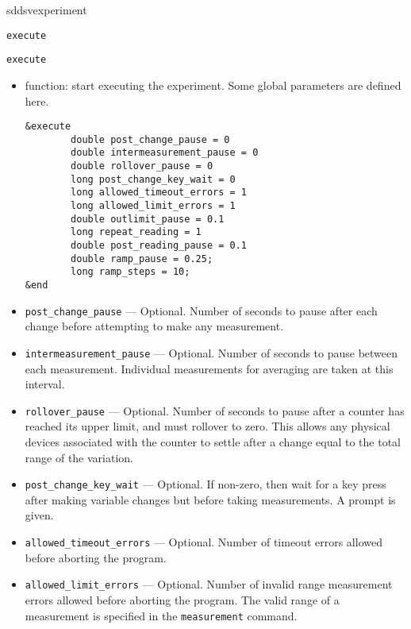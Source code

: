 \begin{sddsprog}{sddsvexperiment}
\begin{itemize}
\begin{latexonly}
\newpage\begin{center}{\Large \verb+execute+}\end{center}
\end{latexonly}
\begin{htmlonly}
  \item {\Large \verb+execute+}
\end{htmlonly}
  \begin{itemize}
    \item function: start executing the experiment. Some global parameters are defined here.
\begin{verbatim}
&execute
        double post_change_pause = 0
        double intermeasurement_pause = 0
        double rollover_pause = 0
        long post_change_key_wait = 0
        long allowed_timeout_errors = 1
        long allowed_limit_errors = 1
        double outlimit_pause = 0.1
        long repeat_reading = 1
        double post_reading_pause = 0.1
        double ramp_pause = 0.25;
        long ramp_steps = 10;
&end
\end{verbatim}
    \item {\verb+post_change_pause+} ---  Optional. Number of seconds to pause after each change before
      attempting to make any measurement.

    \item {\verb+intermeasurement_pause+} --- Optional. Number of
      seconds to pause between each measurement.  Individual
      measurements for averaging are taken at this interval.

    \item {\verb+rollover_pause+} --- Optional. Number of seconds to
      pause after a counter has reached its upper limit, and must
      rollover to zero. This allows any physical devices associated
      with the counter to settle after a change equal to the total
      range of the variation.

    \item {\verb+post_change_key_wait+} --- Optional. If non-zero, then
      wait for a key press after making variable changes but before
      taking measurements. A prompt is given.

    \item {\verb+allowed_timeout_errors+} --- Optional. Number of
      timeout errors allowed before aborting the program.

    \item {\verb+allowed_limit_errors+} --- Optional. Number of invalid
      range measurement errors allowed before aborting the
      program. The valid range of a measurement is specified in the
      {\verb+measurement+} command.


\end{itemize}
\end{itemize}
\end{sddsprog}
